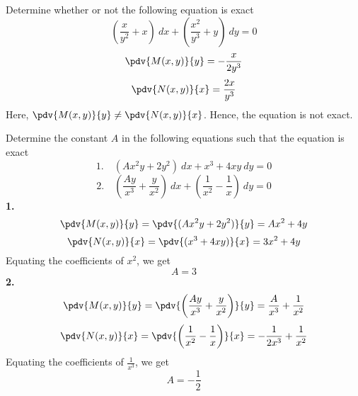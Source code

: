 \begin{example}{
    Determine whether or not the following equation is exact
    \[ \left(\dfrac{x}{y^2} + x\right) \: d{x} + \left(\dfrac{x^2}{y^3} + y\right) \: d{y} = 0 \]
    }{}
    \[ \pdv{M(x,y)}{y} = -\frac{x}{2y^3} \]
    \[ \pdv{N(x,y)}{x} = \frac{2x}{y^3} \]
    Here, $\pdv{M(x,y)}{y} \neq \pdv{N(x,y)}{x}$. Hence, the equation is not exact.
\end{example}

\begin{example}{Determine the constant $A$ in the following equations such that the equation is exact
    \begin{equation*} 1.\quad
        (Ax^2y + 2y^2) \: d{x} + x^3 + 4xy \: d{y} = 0
    \end{equation*}
    \begin{equation*} 2.\quad
        \left( \frac{Ay}{x^3} + \frac{y}{x^2} \right) \: d{x} + \left( \frac{1}{x^2} - \frac{1}{x} \right) \: d{y} = 0
    \end{equation*}
}{}
    \textbf{1.}
    \[ \pdv{M(x,y)}{y} = \pdv{(Ax^2y + 2y^2)}{y} = Ax^2 + 4y \]
    \[ \pdv{N(x,y)}{x} = \pdv{(x^3 + 4xy)}{x} = 3x^2 + 4y \]
    Equating the coefficients of $x^2$, we get \[
        \boxed{A=3}
    \]
    \textbf{2.}
    \[ \pdv{M(x,y)}{y} = \pdv{ \left( \frac{Ay}{x^3} + \frac{y}{x^2} \right) }{y} = \frac{A}{x^3} + \frac{1}{x^2} \]
    \[ \pdv{N(x,y)}{x} = \pdv{ \left( \frac{1}{x^2} - \frac{1}{x} \right) }{x} = -\frac{1}{2x^3} + \frac{1}{x^2} \]
    Equating the coefficients of $\frac{1}{x^3}$, we get \[
        \boxed{A = -\frac{1}{2}}
    \]
\end{example}








